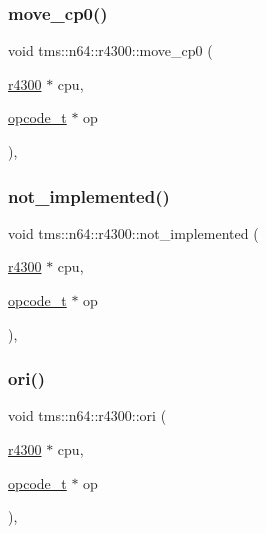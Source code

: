 \mbox{\label{classtms_1_1n64_1_1r4300_ab48f902e87c6a28fbfed7d7558546267}} 
\subsubsection{\texorpdfstring{move\+\_\+cp0()}{move\_cp0()}}
{\footnotesize\ttfamily void tms\+::n64\+::r4300\+::move\+\_\+cp0 (\begin{DoxyParamCaption}\item[{\hyperlink{classtms_1_1n64_1_1r4300}{r4300} $\ast$}]{cpu,  }\item[{\hyperlink{classtms_1_1n64_1_1opcode__t}{opcode\+\_\+t} $\ast$}]{op }\end{DoxyParamCaption})\hspace{0.3cm}{\ttfamily [static]}, {\ttfamily [private]}}

\mbox{\label{classtms_1_1n64_1_1r4300_a5637ec65dead3d51dee7f12d64b956db}} 
\subsubsection{\texorpdfstring{not\+\_\+implemented()}{not\_implemented()}}
{\footnotesize\ttfamily void tms\+::n64\+::r4300\+::not\+\_\+implemented (\begin{DoxyParamCaption}\item[{\hyperlink{classtms_1_1n64_1_1r4300}{r4300} $\ast$}]{cpu,  }\item[{\hyperlink{classtms_1_1n64_1_1opcode__t}{opcode\+\_\+t} $\ast$}]{op }\end{DoxyParamCaption})\hspace{0.3cm}{\ttfamily [static]}, {\ttfamily [private]}}

\mbox{\label{classtms_1_1n64_1_1r4300_a426892d198c792a9d8ed2a67f7d6199e}} 
\subsubsection{\texorpdfstring{ori()}{ori()}}
{\footnotesize\ttfamily void tms\+::n64\+::r4300\+::ori (\begin{DoxyParamCaption}\item[{\hyperlink{classtms_1_1n64_1_1r4300}{r4300} $\ast$}]{cpu,  }\item[{\hyperlink{classtms_1_1n64_1_1opcode__t}{opcode\+\_\+t} $\ast$}]{op }\end{DoxyParamCaption})\hspace{0.3cm}{\ttfamily [static]}, {\ttfamily [private]}}

